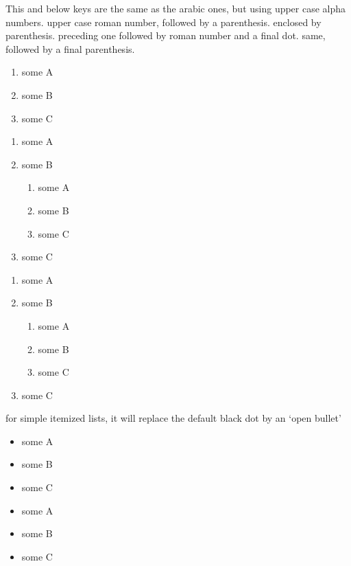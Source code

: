 \documentclass[dctools,english,tocdepth=3,secdepth=3]{ufrgscca} %
\begin{document}
\begin{Keys}
	 This and below keys are the same as the arabic ones, but using upper case alpha numbers.
	 upper case roman number, followed by a parenthesis.
	 enclosed by parenthesis.
	 preceding one followed by roman number and a final dot.
	 same, followed by a final parenthesis.
	\begin{stcode}[st=enumC]
	\begin{enumerate}
		\item some A
		\item some B
		\item some C
	\end{enumerate}
	\begin{enumerate}
		\item some A
		\item some B
		\begin{enumerate}
			\item some A
			\item some B
			\item some C
		\end{enumerate}
		\item some C
	\end{enumerate}
	\begin{enumerate}
		\item some A
		\item some B
		\begin{enumerate}
			\item some A
			\item some B
			\item some C
		\end{enumerate}
		\item some C
	\end{enumerate}
\end{stcode}


	 for simple itemized lists, it will replace the default black dot by an `open bullet'
	\begin{stcode}[st=enumD]
	\begin{itemize}[tcc,miditemsep]
		\item some A
		\item some B
		\item some C
	\end{itemize}
	\begin{itemize}[tcc,bullet,miditemsep]
		\item some A
		\item some B
		\item some C
	\end{itemize}
\end{stcode}



\end{Keys}
\end{document}
